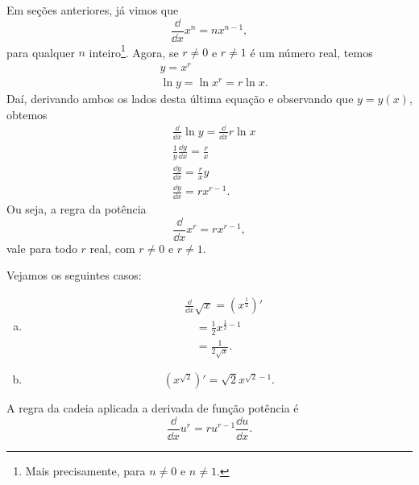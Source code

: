 \begin{obs}
  Em seções anteriores, já vimos que
  \begin{equation}
    \frac{\dd}{\dd x}x^n = nx^{n-1},
  \end{equation}
  para qualquer $n$ inteiro\footnote{Mais precisamente, para $n\neq 0$ e $n\neq 1$.}. Agora, se $r\neq 0$ e $r\neq 1$ é um número real, temos
  \begin{align}
    & y = x^r \\
    & \ln y = \ln x^r = r\ln x.
  \end{align}
  Daí, derivando ambos os lados desta última equação e observando que $y = y(x)$, obtemos
  \begin{align}
    & \frac{\dd}{\dd x} \ln y = \frac{\dd}{\dd x} r\ln x \\
    & \frac{1}{y}\frac{\dd y}{\dd x} = \frac{r}{x} \\
    & \frac{\dd y}{\dd x} = \frac{r}{x}y \\
    & \frac{\dd y}{\dd x} = rx^{r-1}.
  \end{align}
  Ou seja, a regra da potência
  \begin{equation}
    \frac{\dd}{\dd x}x^r = rx^{r-1},
  \end{equation}
  vale para todo $r$ real, com $r\neq 0$ e $r\neq 1$.
\end{obs}

\begin{ex}
  Vejamos os seguintes casos:
  \begin{enumerate}[a)]
  \item
    \begin{align}
      & \frac{\dd}{\dd x}\sqrt{x} = \left(x^{\frac{1}{2}}\right)' \\
      & \text{}\quad = \frac{1}{2}x^{\frac{1}{2}-1} \\
      & \text{}\quad = \frac{1}{2\sqrt{x}}.
    \end{align}
  \item
    \begin{equation}
      \left(x^{\sqrt{2}}\right)' = \sqrt{2}x^{\sqrt{2}-1}.
    \end{equation}
  \end{enumerate}
\end{ex}

\begin{obs}
  A regra da cadeia aplicada a derivada de função potência é
  \begin{equation}\label{eq:deriv_rcfp}
    \frac{\dd}{\dd x}u^r = ru^{r-1}\frac{\dd u}{\dd x}.
  \end{equation}
\end{obs}

